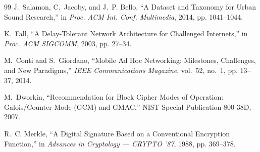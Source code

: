 \documentclass[conference]{IEEEtran}
\begin{document}
\begin{thebibliography}{99}
J.~Salamon, C.~Jacoby, and J.~P. Bello, ``A Dataset and Taxonomy for Urban Sound Research,'' in \emph{Proc. ACM Int. Conf. Multimedia}, 2014, pp. 1041--1044.

K.~Fall, ``A Delay-Tolerant Network Architecture for Challenged Internets,'' in \emph{Proc. ACM SIGCOMM}, 2003, pp. 27--34.

M.~Conti and S.~Giordano, ``Mobile Ad Hoc Networking: Milestones, Challenges, and New Paradigms,'' \emph{IEEE Communications Magazine}, vol.~52, no.~1, pp. 13--37, 2014.

M.~Dworkin, ``Recommendation for Block Cipher Modes of Operation: Galois/Counter Mode (GCM) and GMAC,'' NIST Special Publication 800-38D, 2007.

R.~C. Merkle, ``A Digital Signature Based on a Conventional Encryption Function,'' in \emph{Advances in Cryptology --- CRYPTO '87}, 1988, pp. 369--378.

\end{thebibliography}
\end{document}
